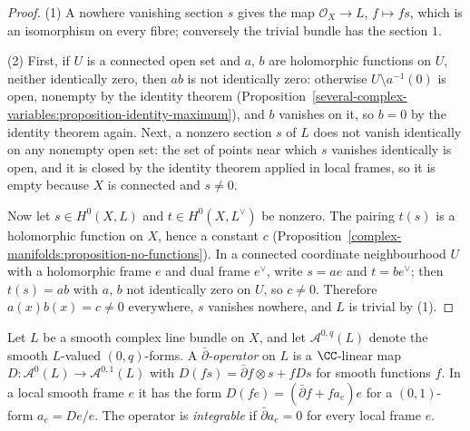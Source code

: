 \begin{proof}
(1) A nowhere vanishing section $s$ gives the map $\mathcal{O}_X \to L$, $f \mapsto fs$, which is an isomorphism on every fibre; conversely the trivial bundle has the section $1$.

(2) First, if $U$ is a connected open set and $a$, $b$ are holomorphic functions on $U$, neither identically zero, then $ab$ is not identically zero: otherwise $U \setminus a^{-1}(0)$ is open, nonempty by the identity
theorem (Proposition~\ref{several-complex-variables:proposition-identity-maximum}), and $b$ vanishes on it, so $b = 0$ by the identity theorem again. Next, a nonzero section $s$ of $L$ does not vanish identically on any
nonempty open set: the set of points near which $s$ vanishes identically is open, and it is closed by the identity theorem applied in local frames, so it is empty because $X$ is connected and $s \neq 0$.

Now let $s \in H^0(X, L)$ and $t \in H^0(X, L^\vee)$ be nonzero. The pairing $t(s)$ is a holomorphic function on $X$, hence a constant $c$ (Proposition~\ref{complex-manifolds:proposition-no-functions}). In a
connected coordinate neighbourhood $U$ with a holomorphic frame $e$ and dual frame $e^\vee$, write $s = ae$ and $t = be^\vee$; then $t(s) = ab$ with $a$, $b$ not identically zero on $U$, so $c \neq 0$. Therefore
$a(x)b(x) = c \neq 0$ everywhere, $s$ vanishes nowhere, and $L$ is trivial by (1).
\end{proof}

\begin{definition}\label{holomorphic-bundles:definition-dbar-operator}
Let $L$ be a smooth complex line bundle on $X$, and let $\mathcal{A}^{0,q}(L)$ denote the smooth $L$-valued $(0,q)$-forms. A \emph{$\bar\partial$-operator} on $L$ is a $\CC$-linear map
$D \colon \mathcal{A}^0(L) \to \mathcal{A}^{0,1}(L)$ with $D(fs) = \bar\partial f \otimes s + fDs$ for smooth functions $f$. In a local smooth frame $e$ it has the form $D(fe) = (\bar\partial f + fa_e)e$ for a
$(0,1)$-form $a_e = De/e$. The operator is \emph{integrable} if $\bar\partial a_e = 0$ for every local frame $e$.
\end{definition}

